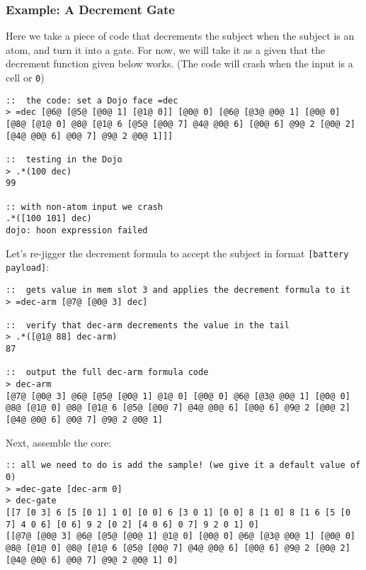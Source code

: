 \documentclass[twoside]{article}
\begin{document}
\subsubsection{Example:  A Decrement Gate}

Here we take a piece of code that decrements the subject when the subject is an atom, and turn it into a gate.  For now, we will take it as a given that the decrement function given below works. (The code will crash when the input is a cell or \lstinline[style=inlinecode]{0})

\begin{lstlisting}[style=listingcode]
::  the code: set a Dojo face =dec
> =dec [@6@ [@5@ [@0@ 1] [@1@ 0]] [@0@ 0] [@6@ [@3@ @0@ 1] [@0@ 0] [@8@ [@1@ 0] @8@ [@1@ 6 [@5@ [@0@ 7] @4@ @0@ 6] [@0@ 6] @9@ 2 [@0@ 2] [@4@ @0@ 6] @0@ 7] @9@ 2 @0@ 1]]]

::  testing in the Dojo
> .*(100 dec)
99

:: with non-atom input we crash
.*([100 101] dec)
dojo: hoon expression failed
\end{lstlisting}

Let's re-jigger the decrement formula to accept the subject in format \lstinline[style=inlinecode]{[battery payload]}:

\begin{lstlisting}[style=listingcode]
::  gets value in mem slot 3 and applies the decrement formula to it
> =dec-arm [@7@ [@0@ 3] dec]

::  verify that dec-arm decrements the value in the tail
> .*([@1@ 88] dec-arm)
87

::  output the full dec-arm formula code
> dec-arm
[@7@ [@0@ 3] @6@ [@5@ [@0@ 1] @1@ 0] [@0@ 0] @6@ [@3@ @0@ 1] [@0@ 0] @8@ [@1@ 0] @8@ [@1@ 6 [@5@ [@0@ 7] @4@ @0@ 6] [@0@ 6] @9@ 2 [@0@ 2] [@4@ @0@ 6] @0@ 7] @9@ 2 @0@ 1]
\end{lstlisting}

Next, assemble the core:

\begin{lstlisting}[style=listingcode]
:: all we need to do is add the sample! (we give it a default value of 0)
> =dec-gate [dec-arm 0]
> dec-gate
[[7 [0 3] 6 [5 [0 1] 1 0] [0 0] 6 [3 0 1] [0 0] 8 [1 0] 8 [1 6 [5 [0 7] 4 0 6] [0 6] 9 2 [0 2] [4 0 6] 0 7] 9 2 0 1] 0]
[[@7@ [@0@ 3] @6@ [@5@ [@0@ 1] @1@ 0] [@0@ 0] @6@ [@3@ @0@ 1] [@0@ 0] @8@ [@1@ 0] @8@ [@1@ 6 [@5@ [@0@ 7] @4@ @0@ 6] [@0@ 6] @9@ 2 [@0@ 2] [@4@ @0@ 6] @0@ 7] @9@ 2 @0@ 1] 0]
\end{lstlisting}
\end{document}
